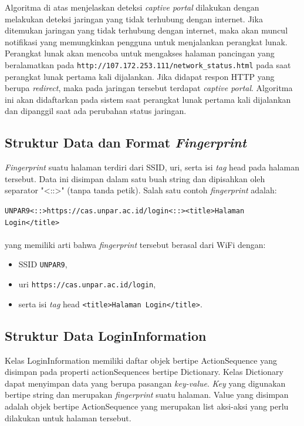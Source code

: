 \hfill

Algoritma di atas menjelaskan deteksi \textit{captive portal} dilakukan dengan melakukan deteksi jaringan yang tidak terhubung dengan internet. Jika ditemukan jaringan yang tidak terhubung dengan internet, maka akan muncul notifikasi yang memungkinkan pengguna untuk menjalankan perangkat lunak. Perangkat lunak akan mencoba untuk mengakses halaman pancingan yang beralamatkan pada \texttt{http://107.172.253.111/network\_status.html} pada saat perangkat lunak pertama kali dijalankan. Jika didapat respon HTTP yang berupa \textit{redirect}, maka pada jaringan tersebut terdapat \textit{captive portal}. Algoritma ini akan didaftarkan pada sistem saat perangkat lunak pertama kali dijalankan dan dipanggil saat ada perubahan status jaringan.

\subsection{Struktur Data dan Format \textit{Fingerprint}}
\label{subsec:struktur_data_dan_format_fingerprint}

\textit{Fingerprint} suatu halaman terdiri dari SSID, uri, serta isi \textit{tag} head pada halaman tersebut. Data ini disimpan dalam satu buah string dan dipisahkan oleh separator "<::>" (tanpa tanda petik). Salah satu contoh \textit{fingerprint} adalah:

\hfill

\texttt{UNPAR9<::>https://cas.unpar.ac.id/login<::><title>Halaman Login</title>}\\\\
yang memiliki arti bahwa \textit{fingerprint} tersebut berasal dari WiFi dengan:

\begin{itemize}
    \item{SSID \texttt{UNPAR9},}
    \item{uri \texttt{https://cas.unpar.ac.id/login},}
    \item{serta isi \textit{tag} head \texttt{<title>Halaman Login</title>}.}
\end{itemize}

\subsection{Struktur Data LoginInformation}
\label{subsec:struktur_data_logininformation}

Kelas LoginInformation memiliki daftar objek bertipe ActionSequence yang disimpan pada properti actionSequences bertipe Dictionary. Kelas Dictionary dapat menyimpan data yang berupa pasangan \textit{key-value}. \textit{Key} yang digunakan bertipe string dan merupakan \textit{fingerprint} suatu halaman. Value yang disimpan adalah objek bertipe ActionSequence yang merupakan list aksi-aksi yang perlu dilakukan untuk halaman tersebut.

